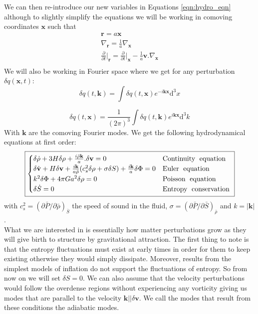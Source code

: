 We can then re-introduce our new variables in Equations \ref{eqn:hydro_eqn} although to slightly simplify the equations we will be working in comoving coordinates $\mathbf{x}$ such that 
\begin{align*}
    \mathbf{r} = a \mathbf{x} \\
    \nabla_{\mathbf{r}} = \frac{1}{a} \nabla_{\mathbf{x}} \\
    \frac{\partial}{\partial t}\bigg\rvert_{\mathbf{r}} = \frac{\partial}{\partial t}\bigg\rvert_{\mathbf{x}} - \frac{1}{a}\mathbf{v} . \nabla_{\mathbf{x}} \\
\end{align*}
We will also be working in Fourier space where we get for any perturbation $\delta q(\mathbf{x}, t)$:
\begin{equation}
    \delta q(t, \mathbf{k}) = \int \delta q (t, \mathbf{x}) e^{-i \mathbf{k}\mathbf{x}} \text{d}^3x
\end{equation}

\begin{equation}
    \delta q(t, \mathbf{x}) = \frac{1}{(2\pi)^3} \int \delta q (t, \mathbf{k}) e^{i \mathbf{k}\mathbf{x}} \text{d}^3k
\end{equation}
With $\mathbf{k}$ are the comoving Fourier modes. We get the following hydrodynamical equations at first order:
\begin{equation}
    \boxed{
    \begin{cases}
        \delta \dot{\rho} + 3H\delta \rho + \frac{i\bar{\rho}\mathbf{k}}{a} . \delta\mathbf{v} = 0& \text{Continuity\; equation\;} \\
        \delta \dot{\mathbf{v}} + H \delta \mathbf{v} + \frac{i\mathbf{k}}{a\bar{\rho}}(c_s^2 \delta \rho + \sigma \delta S) + \frac{i \mathbf{k}}{a} \delta \Phi = 0 & \text{Euler\; equation\;} \\
        k^2 \delta \Phi + 4 \pi G a^2 \delta \rho = 0 & \text{Poisson\; equation\;} \\
        \delta \dot{S} = 0& \text{Entropy\; conservation\;}
    \end{cases}
    }
    \label{eqn:newton_hydro_eqn}
\end{equation}
with $c_s^2 = (\partial \bar{P}/ \partial \bar{\rho})_{\bar{S}}$ the speed of sound in the fluid, $\sigma = (\partial \bar{P}/ \partial \bar{S})_{\bar{\rho}}$ and $k=|\mathbf{k}|$. \\


What we are interested in is essentially how matter perturbations grow as they will give birth to structure by gravitational attraction. The first thing to note is 
that the entropy fluctuations must exist at early times in order for them to keep existing otherwise they would simply dissipate. Moreover, results from the simplest 
models of inflation do not support the fluctuations of entropy. So from now on we will set $\delta S = 0$. We can also assume that the velocity perturbations would follow the overdense regions
without experiencing any vorticity giving us modes that are parallel to the velocity $\mathbf{k} || \delta \mathbf{v}$. 
We call the modes that result from these conditions the adiabatic modes. \\

